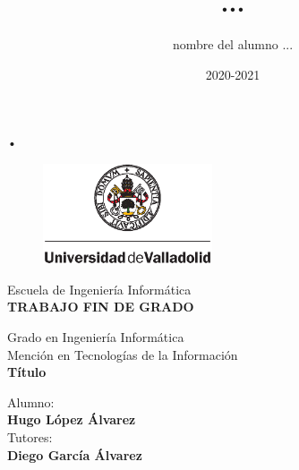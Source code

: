 \documentclass[openright,twoside,10pt]{book}
\date{2020-2021}
\author{nombre del alumno ...}
\title{...}
\begin{document}
\begin{titlepage}

\begin{center}
\vspace*{-0.5in}\textsc{•}
\begin{figure}[htb]
\begin{center}
\includegraphics[width=5cm]{./img/uva}
\end{center}
\end{figure}

\vspace*{0.3in}
\huge
{\selectfont Escuela de Ingeniería Informática}
\\
\vspace*{0.5in}
\large
{\selectfont \textbf{\textsc{\textsc{TRABAJO FIN DE GRADO}}}}


\vspace*{0.2in}
\selectfont Grado en Ingeniería Informática\\
\selectfont Mención en Tecnologías de la Información\\
\vspace*{0.8in}
\huge
{\selectfont\textbf{Título}}
\vspace*{1in}
\begin{large}
\begin{flushright}
Alumno:\\\textbf{Hugo López Álvarez}\\
\vspace*{0.3in}
Tutores:\\ \textbf{Diego García Álvarez}\\
\end{flushright}
\end{large}
\end{center}

\end{titlepage}

\newpage
\mbox{}	
\thispagestyle{empty} %
\end{document}
